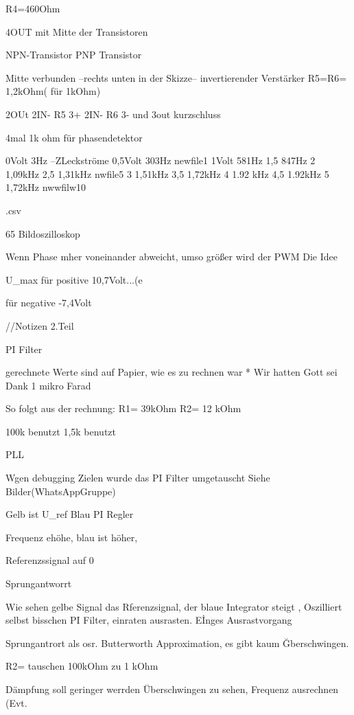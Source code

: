 R4=460Ohm 

4OUT mit Mitte der Transistoren

NPN-Transistor
PNP Transistor

Mitte verbunden
--rechts unten in der Skizze-- invertierender Verstärker R5=R6= 1,2kOhm( für 1kOhm)

2OUt 2IN- R5
 3+    2IN-     R6
 3- und 3out kurzschluss




 4mal 1k ohm für phasendetektor


 0Volt 3Hz --ZLeckströme
 0,5Volt  303Hz newfile1
 1Volt 581Hz      
 1,5   847Hz
 2     1,09kHz
 2,5  1,31kHz  nwfile5
 3  1,51kHz
 3,5    1,72kHz
 4   1.92 kHz
 4,5 1.92kHz
 5   1,72kHz nwwfilw10


.csv

65
Bildoszilloskop

Wenn Phase mher voneinander abweicht, umso größer wird der PWM
Die Idee 

U_max für positive
10,7Volt...(e

für negative -7,4Volt


//Notizen 2.Teil



PI Filter

gerechnete Werte sind auf Papier, wie es zu rechnen war
* Wir hatten Gott sei Dank 1 mikro Farad

So folgt aus der rechnung: R1= 39kOhm
R2= 12 kOhm




100k benutzt
1,5k benutzt


PLL

Wgen debugging Zielen wurde das PI Filter umgetauscht
Siehe Bilder(WhatsAppGruppe)





Gelb ist U_ref
Blau PI Regler

Frequenz ehöhe, blau ist höher, 

Referenzssignal auf 0


Sprungantworrt

Wie sehen gelbe Signal das Rferenzsignal, der blaue Integrator steigt , Oszilliert selbst bisschen PI Filter, einraten ausrasten. Eİnges Ausrastvorgang

Sprungantrort als osr.
Butterworth Approximation, es gibt kaum Ğberschwingen. 

R2= tauschen 100kOhm zu 1 kOhm

Dämpfung soll geringer werrden
Überschwingen zu sehen,
Frequenz ausrechnen
(Evt. 

